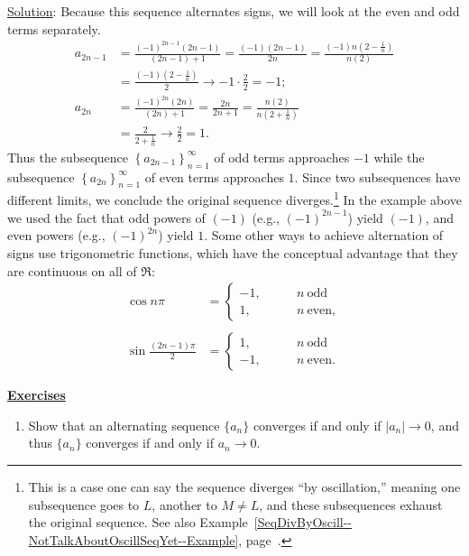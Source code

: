 \underline{Solution}: Because this sequence alternates signs,
we will look at the even and odd terms 
separately.
\begin{align*}
a_{2n-1}&=\frac{(-1)^{2n-1}(2n-1)}{(2n-1)+1}
         =\frac{(-1)(2n-1)}{2n}=\frac{(-1)n\left(2-\frac1n\right)}
           {n(2)}\\&=\frac{(-1)\left(2-\frac1n\right)}{2}
        \longrightarrow -1\cdot\frac22=-1;\\
a_{2n}&=\frac{(-1)^{2n}(2n)}{(2n)+1}=\frac{2n}{2n+1}
       =\frac{n(2)}{n\left(2+\frac1n\right)}\\
       &=\frac{2}{2+\frac1n}\longrightarrow \frac22=1.
\end{align*}
Thus the subsequence $\left\{a_{2n-1}\right\}_{n=1}^\infty$
of odd terms approaches $-1$ while
the subsequence $\left\{a_{2n}\right\}_{n=1}^\infty$
of even terms approaches $1$.
Since two subsequences have different limits, we
conclude the original sequence diverges.\footnote{%
This is a case one can say the sequence diverges ``by oscillation,''
meaning one subsequence goes to $L$, another to $M\ne L$,
and these subsequences exhaust the original sequence.
See also 
Example~\ref{SeqDivByOscill--NotTalkAboutOscillSeqYet--Example},
page~\pageref{SeqDivByOscill--NotTalkAboutOscillSeqYet--Example}.}
\eex
In the example above we used the fact that odd powers of $(-1)$
(e.g., $(-1)^{2n-1}$)  yield $(-1)$, and even 
powers (e.g., $(-1)^{2n}$) yield $1$.  Some other ways to achieve
alternation of signs use trigonometric functions, which have
the conceptual advantage that they are continuous on all of $\Re$:
\begin{align*}
\cos n\pi&=\left\{\begin{array}
   {rl}-1,\qquad&n\ \text{odd}\\
    1,\qquad&n\ \text{even},\end{array}\right.\\ \\
\sin\frac{(2n-1)\pi}{2}&=
     \left\{\begin{array}{rl}
    1,\qquad &n\ \text{odd}\\
   -1,\qquad &n\ \text{even}.\end{array}
            \right.
\end{align*}



\begin{center}
\underline{\Large{\bf Exercises}}\end{center}
\begin{multicols}{2}
\begin{enumerate}
\item Show that an alternating sequence $\{a_n\}$ converges
if and only if $\left|a_n\right|\longrightarrow0$, and
thus $\{a_n\}$ converges if and only if $a_n\longrightarrow0$.
\end{enumerate}
\end{multicols}




